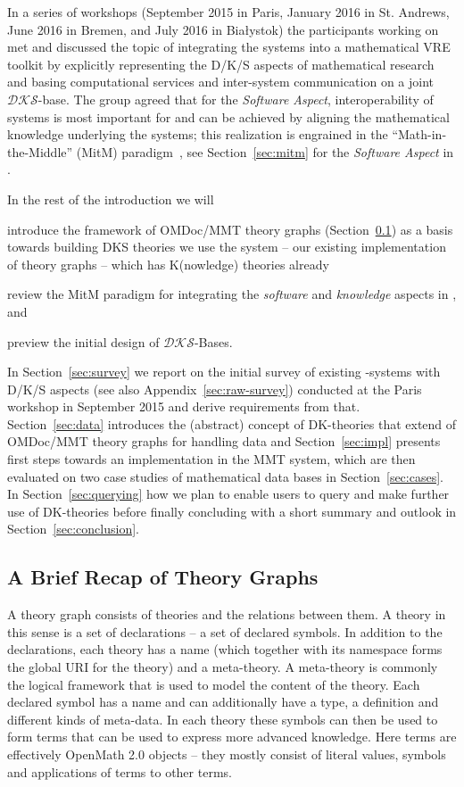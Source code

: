 In a series of workshops (September 2015 in Paris, January 2016 in St. Andrews, June 2016
in Bremen, and July 2016 in Bia{\l}ystok) the participants working on  met
and discussed the topic of integrating the \pn systems into a mathematical VRE toolkit by
explicitly representing the D/K/S aspects of mathematical research and basing
computational services and inter-system communication on a joint $\mathcal{DKS}$-base. The
group agreed that for the \emph{Software Aspect}, interoperability of systems is most
important for \pn and can be achieved by aligning the mathematical knowledge underlying
the systems; this realization is engrained in the ``Math-in-the-Middle'' (MitM)
paradigm~\cite{DehKohKon:iop16}, see Section~\ref{sec:mitm} for the \emph{Software Aspect}
in \pn.

In the rest of the introduction we will 
\begin{compactenum}
\item introduce the framework of OMDoc/MMT theory graphs (Section~\ref{sec:MMT}) as a
  basis towards building DKS theories we use the \MMT system -- our existing
  implementation of theory graphs -- which has K(nowledge) theories already 
\item review the MitM paradigm for integrating the \emph{software} and \emph{knowledge}
  aspects in \pn, and
\item preview the initial design of $\mathcal{DKS}$-Bases.
\end{compactenum}
In Section~\ref{sec:survey} we report on the initial survey of existing \pn-systems with
D/K/S aspects (see also Appendix~\ref{sec:raw-survey}) conducted at the Paris workshop in
September 2015 and derive requirements from that.  Section~\ref{sec:data} introduces the
(abstract) concept of DK-theories that extend of OMDoc/MMT theory graphs for handling data
and Section~\ref{sec:impl} presents first steps towards an implementation in the MMT
system, which are then evaluated on two case studies of mathematical data bases in
Section~\ref{sec:cases}. In Section~\ref{sec:querying} how we plan to enable users to
query and make further use of DK-theories before finally concluding with a short summary
and outlook in Section~\ref{sec:conclusion}.

\subsection{A Brief Recap of Theory Graphs}\label{sec:MMT}

A theory graph consists of theories and the relations between them. A theory in this sense
is a set of declarations -- a set of declared symbols. In addition to the declarations,
each theory has a name (which together with its namespace forms the global URI for the
theory) and a meta-theory. A meta-theory is commonly the logical framework that is used to
model the content of the theory. Each declared symbol has a name and can additionally have
a type, a definition and different kinds of meta-data. In each theory these symbols can
then be used to form terms that can be used to express more advanced knowledge. Here terms
are effectively OpenMath 2.0 \cite{BusCapCar:2oms04} objects -- they mostly consist of
literal values, symbols and applications of terms to other terms.

